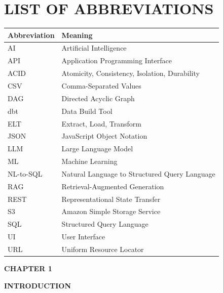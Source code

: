 \documentclass[12pt,a4paper]{report}
\newcommand{\chaptersplit}[2]{%
  \clearpage
  \thispagestyle{empty}%
  \vspace*{\fill}
  \begin{center}
    {\fontsize{16}{20}\selectfont\bfseries CHAPTER #1\par}
    \vspace{1.2cm}
    {\fontsize{16}{20}\selectfont\bfseries #2\par}
  \end{center}
  \vspace*{\fill}
  \clearpage
}
\begin{document}
\clearpage
{}
\listoftables

\clearpage
\chapter*{LIST OF ABBREVIATIONS}

\begin{center}
\begin{tabular}{@{}ll@{}}
\toprule
\textbf{Abbreviation} & \textbf{Meaning} \\
\midrule
AI & Artificial Intelligence \\
API & Application Programming Interface \\
ACID & Atomicity, Consistency, Isolation, Durability \\
CSV & Comma-Separated Values \\
DAG & Directed Acyclic Graph \\
dbt & Data Build Tool \\
ELT & Extract, Load, Transform \\
JSON & JavaScript Object Notation \\
LLM & Large Language Model \\
ML & Machine Learning \\
NL-to-SQL & Natural Language to Structured Query Language \\
RAG & Retrieval-Augmented Generation \\
REST & Representational State Transfer \\
S3 & Amazon Simple Storage Service \\
SQL & Structured Query Language \\
UI & User Interface \\
URL & Uniform Resource Locator \\
\bottomrule
\end{tabular}
\end{center}

\clearpage
{}   %

\chaptersplit{1}{INTRODUCTION}
\end{document}
